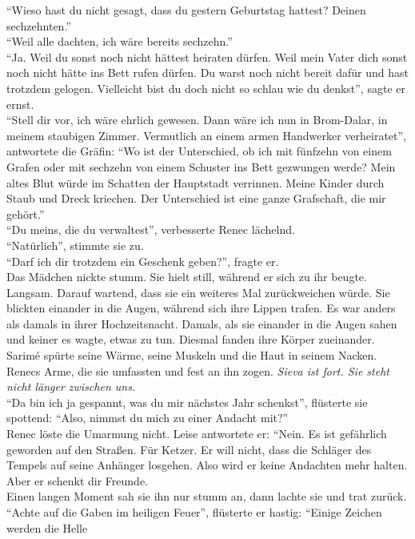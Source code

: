 ``Wieso hast du nicht gesagt, dass du gestern Geburtstag hattest? Deinen sechzehnten.''\\
``Weil alle dachten, ich wäre bereits sechzehn.''\\
``Ja. Weil du sonst noch nicht hättest heiraten dürfen. Weil mein Vater dich sonst noch nicht hätte 
ins Bett rufen dürfen. Du warst noch nicht bereit dafür und hast trotzdem gelogen. Vielleicht bist 
du doch nicht so schlau wie du denkst'', sagte er ernst.\\
``Stell dir vor, ich wäre ehrlich gewesen. Dann wäre ich nun in Brom-Dalar, in meinem staubigen 
Zimmer. Vermutlich an einem armen Handwerker verheiratet'', antwortete die Gräfin: ``Wo ist der 
Unterschied, ob ich mit fünfzehn von einem Grafen oder mit sechzehn von einem Schuster ins Bett 
gezwungen werde? Mein altes Blut würde im Schatten der Hauptstadt verrinnen. Meine Kinder durch 
Staub und Dreck kriechen. Der Unterschied ist eine ganze Grafschaft, die mir gehört.''\\
``Du meins, die du verwaltest'', verbesserte Renec lächelnd.\\
``Natürlich'', stimmte sie zu.\\
``Darf ich dir trotzdem ein Geschenk geben?'', fragte er.\\
Das Mädchen nickte stumm. Sie hielt still, während er sich zu ihr beugte. Langsam. Darauf 
wartend, dass sie ein weiteres Mal zurückweichen würde. Sie blickten einander in die Augen, während 
sich ihre Lippen trafen. Es war anders als damals in ihrer Hochzeitsnacht. Damals, als sie 
einander in die Augen sahen und keiner es wagte, etwas zu tun. Diesmal fanden ihre Körper 
zueinander. Sarimé spürte seine Wärme, seine Muskeln und die Haut in seinem Nacken. Renecs Arme, 
die sie umfassten und fest an ihn zogen. \textit{Sieva ist fort. Sie steht nicht länger zwischen 
uns.}\\
``Da bin ich ja gespannt, was du mir nächstes Jahr schenkst'', flüsterte sie spottend: 
``Also, nimmst du mich zu einer Andacht mit?''\\
Renec löste die Umarmung nicht. Leise antwortete er: ``Nein. Es ist gefährlich geworden auf den 
Straßen. Für Ketzer. Er will nicht, dass die Schläger des Tempels auf seine Anhänger losgehen. Also 
wird er keine Andachten mehr halten. Aber er schenkt dir Freunde.\\
Einen langen Moment sah sie ihn nur stumm an, dann lachte sie und trat zurück.\\
``Achte auf die Gaben im heiligen Feuer'', flüsterte er hastig: ``Einige Zeichen werden die Helle 
